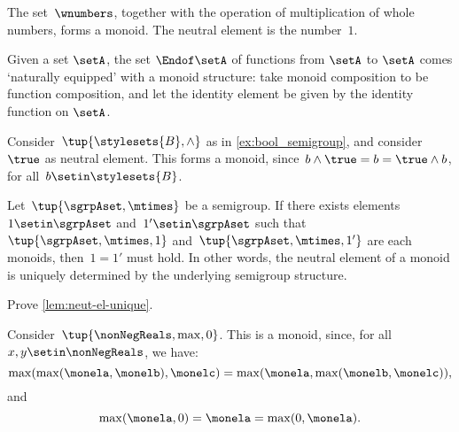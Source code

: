 \begin{example}
    The set~$\wnumbers$, together with the operation of multiplication of whole numbers, forms a monoid.
    The neutral element is the number~$1$.
\end{example}

\begin{example}
Given a set $\setA$, the set $\Endof\setA$ of functions from $\setA$ to $\setA$ comes `naturally equipped' with a monoid structure: take monoid composition to be function composition, and let the identity element be given by the identity function on $\setA$.
\end{example}

\begin{example}
    \label{ex:bool_monoid}
    Consider~$\tup{\stylesets{B},\wedge}$ as in \cref{ex:bool_semigroup}, and consider~$\true$ as neutral element.
    This forms a monoid, since~$b\wedge \true=b=\true \wedge b$, for all~$b\setin \stylesets{B}$.
\end{example}




\begin{lemma}
    \label{lem:neut-el-unique}
    Let~$\tup{\sgrpAset, \mtimes}$ be a semigroup.
    If there exists elements~$1 \setin \sgrpAset$ and~$1' \setin \sgrpAset$ such that~$\tup{\sgrpAset, \mtimes, 1}$ and~$\tup{\sgrpAset, \mtimes, 1'}$ are each monoids, then~$1 = 1'$ must hold.
    In other words, the neutral element of a monoid is uniquely determined by the underlying semigroup structure.
\end{lemma}

\begin{gradedexercise}
    \label{ex:UniqueNeutralMonoid}
    Prove \cref{lem:neut-el-unique}.
\end{gradedexercise}


\begin{example}
    Consider~$\tup{\nonNegReals,\max,0}$.
    This is a monoid, since, for all~$x,y\setin \nonNegReals$, we have:
    \begin{equation*}
        \max(\max(\monela,\monelb),\monelc)=\max(\monela,\max(\monelb,\monelc)),
    \end{equation*}
    and
    \begin{equation*}
        \max(\monela,0)=\monela=\max(0,\monela).
    \end{equation*}
\end{example}

